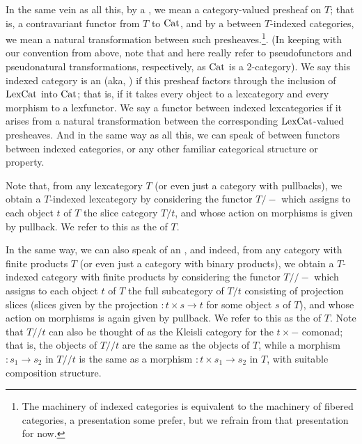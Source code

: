 \begin{definition}
In the same vein as all this, by a , we mean a category-valued presheaf on $T$; that is, a contravariant functor from $T$ to $\mathrm{Cat}$, and by a  between $T$-indexed categories, we mean a natural transformation between such presheaves.\footnote{The machinery of indexed categories is equivalent to the machinery of fibered categories, a presentation some prefer, but we refrain from that presentation for now.}. (In keeping with our convention from above, note that  and  here really refer to pseudofunctors and pseudonatural transformations, respectively, as $\mathrm{Cat}$ is a 2-category). We say this indexed category is an  (aka, ) if this presheaf factors through the inclusion of $\mathrm{LexCat}$ into $\mathrm{Cat}$; that is, if it takes every object to a lexcategory and every morphism to a lexfunctor. We say a functor between indexed lexcategories  if it arises from a natural transformation between the corresponding $\mathrm{LexCat}$-valued presheaves. And in the same way as all this, we can speak of  between functors between indexed categories, or any other familiar categorical structure or property.
\end{definition}

\begin{definition}
Note that, from any lexcategory $T$ (or even just a category with pullbacks), we obtain a $T$-indexed lexcategory by considering the functor $T/-$ which assigns to each object $t$ of $T$ the slice category $T/t$, and whose action on morphisms is given by pullback. We refer to this as the  of $T$.
\end{definition}

\begin{definition}
In the same way, we can also speak of an , and indeed, from any category with finite products $T$ (or even just a category with binary products), we obtain a $T$-indexed category with finite products by considering the functor $T//-$ which assigns to each object $t$ of $T$ the full subcategory of $T/t$ consisting of projection slices (slices given by the projection $: t \times s \to t$ for some object $s$ of $T$), and whose action on morphisms is again given by pullback. We refer to this as the  of $T$. Note that $T//t$ can also be thought of as the Kleisli category for the $t \times -$ comonad; that is, the objects of $T//t$ are the same as the objects of $T$, while a morphism $: s_1 \to s_2$ in $T//t$ is the same as a morphism $: t \times s_1 \to s_2$ in $T$, with suitable composition structure.
\end{definition}

